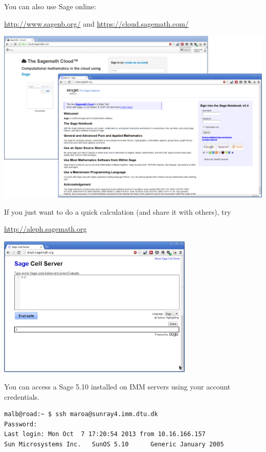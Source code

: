 \documentclass[9pt]{beamer}
\begin{document}
\begin{frame}
\framebreak

You can also use Sage online:
\begin{center}
\url{http://www.sagenb.org/}  and \url{https://cloud.sagemath.com/}
\end{center}

\begin{center}
\includegraphics[width=\textwidth]{sage-online.png}
\end{center}

\framebreak

If you just want to do a quick calculation (and share it with others), try 

\begin{center}
\url{http://aleph.sagemath.org} 
\end{center}

\begin{center}
\includegraphics[width=0.7\textwidth]{sage-aleph.png}
\end{center}

\framebreak

You can access a Sage 5.10 installed on IMM servers using your account credentials.
\begin{lstlisting}[language=bash,basicstyle=\tiny\tt]
malb@road:~ $ ssh maroa@sunray4.imm.dtu.dk
Password: 
Last login: Mon Oct  7 17:20:54 2013 from 10.16.166.157
Sun Microsystems Inc.   SunOS 5.10      Generic January 2005


\end{lstlisting}
\end{frame}
\end{document}
